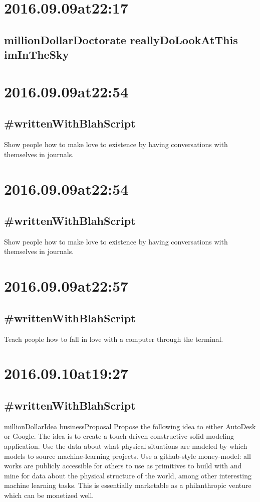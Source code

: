 \begin{enumerate}
\begin{enumerate}
\section*{ 2016.09.09at22:17 }
\subsection*{ millionDollarDoctorate reallyDoLookAtThis imInTheSky }


\section*{ 2016.09.09at22:54 }
\subsection*{ #writtenWithBlahScript }
Show people how to make love to existence by having conversations with themselves in journals.

\section*{ 2016.09.09at22:54 }
\subsection*{ #writtenWithBlahScript }
Show people how to make love to existence by having conversations with themselves in journals.

\section*{ 2016.09.09at22:57 }
\subsection*{ #writtenWithBlahScript }
Teach people how to fall in love with a computer through the terminal.

\section*{ 2016.09.10at19:27 }
\subsection*{ #writtenWithBlahScript }
millionDollarIdea businessProposal Propose the following idea to either AutoDesk or Google. The idea is to create a touch-driven constructive solid modeling application. Use the data about what physical situations are madeled by which models to source machine-learning projects. Use a github-style money-model: all works are publicly accessible for others to use as primitives to build with and mine for data about the physical structure of the world, among other interesting machine learning tasks. This is essentially marketable as a philanthropic venture which can be monetized well.


\end{enumerate}
\end{enumerate}
